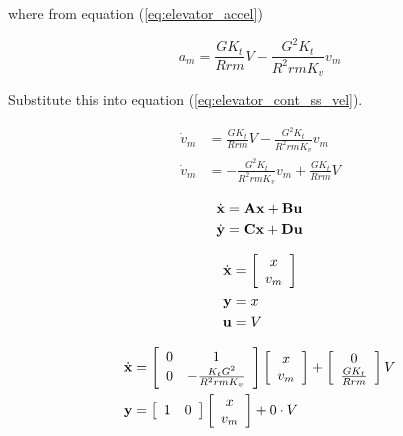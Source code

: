where from equation (\ref{eq:elevator_accel})

\begin{equation*}
  a_m = \frac{GK_t}{Rrm} V - \frac{G^2 K_t}{R^2 rm K_v} v_m
\end{equation*}

Substitute this into equation (\ref{eq:elevator_cont_ss_vel}).

\begin{align}
  \dot{v}_m &= \frac{GK_t}{Rrm} V - \frac{G^2 K_t}{R^2 rm K_v} v_m \nonumber \\
  \dot{v}_m &= -\frac{G^2 K_t}{R^2 rm K_v} v_m + \frac{GK_t}{Rrm} V
\end{align}

\begin{align*}
  \dot{\mathbf{x}} &= \mathbf{A} \mathbf{x} + \mathbf{B} \mathbf{u} \\
  \dot{\mathbf{y}} &= \mathbf{C} \mathbf{x} + \mathbf{D} \mathbf{u}
\end{align*}

\begin{align*}
  \dot{\mathbf{x}} &= \left[
  \begin{array}{c}
    x \\
    v_m
  \end{array}
  \right] \\
  \mathbf{y} &= x \\
  \mathbf{u} &= V
\end{align*}

\begin{align}
  \dot{\mathbf{x}} &= \left[
  \begin{array}{cc}
    0 & 1 \\
    0 & -\frac{K_t G^2}{R^2rmK_v}
  \end{array}
  \right] \left[
  \begin{array}{c}
    x \\
    v_m \\
  \end{array}
  \right] + \left[
  \begin{array}{c}
    0 \\
    \frac{GK_t}{Rrm}
  \end{array}
  \right] V \\
  \mathbf{y} &= \left[
  \begin{array}{cc}
    1 & 0
  \end{array}
  \right] \left[
  \begin{array}{c}
    x \\
    v_m \\
  \end{array}
  \right] + 0 \cdot V
\end{align}

